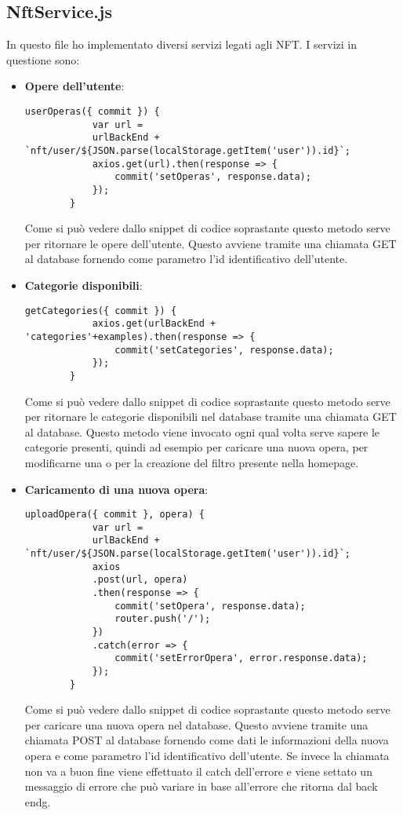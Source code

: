 \subsection{NftService.js}
\label{subsubsec:nftservice}

In questo file ho implementato diversi servizi legati agli NFT. I servizi in questione sono:
\begin{itemize}
	\item \textbf{Opere dell'utente}:
	\begin{lstlisting}[caption=Opere dell'utente., label=lst::opereUtente]
		userOperas({ commit }) {
			var url =
			urlBackEnd + `nft/user/${JSON.parse(localStorage.getItem('user')).id}`;
			axios.get(url).then(response => {
				commit('setOperas', response.data);
			});
		}
	\end{lstlisting}
	Come si può vedere dallo snippet di codice soprastante questo metodo serve per ritornare le opere dell'utente. Questo avviene tramite una chiamata GET al database fornendo come parametro l'id identificativo dell'utente.
	\item \textbf{Categorie disponibili}:
	\begin{lstlisting}[caption=Categorie disponibili., label=lst::catDisponibili]
		getCategories({ commit }) {
			axios.get(urlBackEnd + 'categories'+examples).then(response => {
				commit('setCategories', response.data);
			});
		}
	\end{lstlisting}
	Come si può vedere dallo snippet di codice soprastante questo metodo serve per ritornare le categorie disponibili nel database tramite una chiamata GET al database. Questo metodo viene invocato ogni qual volta serve sapere le categorie presenti, quindi ad esempio per caricare una nuova opera, per modificarne una o per la creazione del filtro presente nella homepage.
	\item \textbf{Caricamento di una nuova opera}:
	\begin{lstlisting}[caption=Caricamento di una nuova opera., label=lst::uploadOpera]
		uploadOpera({ commit }, opera) {
			var url =
			urlBackEnd + `nft/user/${JSON.parse(localStorage.getItem('user')).id}`;
			axios
			.post(url, opera)
			.then(response => {
				commit('setOpera', response.data);
				router.push('/');
			})
			.catch(error => {
				commit('setErrorOpera', error.response.data);
			});
		}
	\end{lstlisting}
	Come si può vedere dallo snippet di codice soprastante questo metodo serve per caricare una nuova opera nel database. Questo avviene tramite una chiamata POST al database fornendo come dati le informazioni della nuova opera e come parametro l'id identificativo dell'utente. Se invece  la chiamata non va a buon fine viene effettuato il catch dell'errore e viene settato un messaggio di errore che può variare in base all'errore che ritorna dal \gls{back endg}.

\end{itemize}
